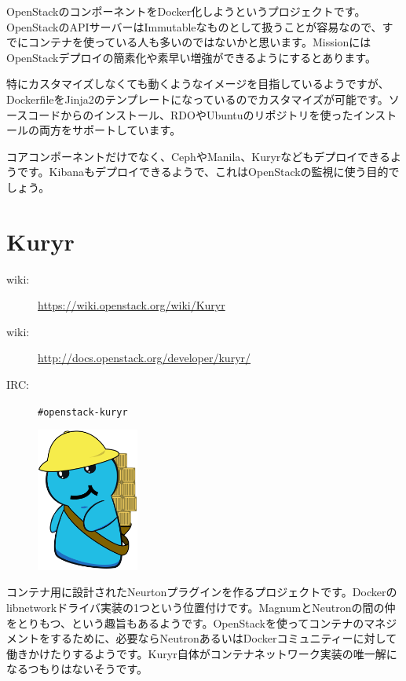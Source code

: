 OpenStackのコンポーネントをDocker化しようというプロジェクトです。OpenStackのAPIサーバーはImmutableなものとして扱うことが容易なので、すでにコンテナを使っている人も多いのではないかと思います。MissionにはOpenStackデプロイの簡素化や素早い増強ができるようにするとあります。

特にカスタマイズしなくても動くようなイメージを目指しているようですが、DockerfileをJinja2のテンプレートになっているのでカスタマイズが可能です。ソースコードからのインストール、RDOやUbuntuのリポジトリを使ったインストールの両方をサポートしています。

コアコンポーネントだけでなく、CephやManila、Kuryrなどもデプロイできるようです。Kibanaもデプロイできるようで、これはOpenStackの監視に使う目的でしょう。

\section{Kuryr}

\begin{description}
	\item[wiki:] \url{https://wiki.openstack.org/wiki/Kuryr}
	\item[wiki:] \url{http://docs.openstack.org/developer/kuryr/}
	\item[IRC:] \verb|#openstack-kuryr|
\end{description}

\begin{figure}
	\begin{center}
		\includegraphics[width=0.3\textwidth]{img/kuryr_logo.png}
	\end{center}
\end{figure}

コンテナ用に設計されたNeurtonプラグインを作るプロジェクトです。Dockerのlibnetworkドライバ実装の1つという位置付けです。MagnumとNeutronの間の仲をとりもつ、という趣旨もあるようです。OpenStackを使ってコンテナのマネジメントをするために、必要ならNeutronあるいはDockerコミュニティーに対して働きかけたりするようです。Kuryr自体がコンテナネットワーク実装の唯一解になるつもりはないそうです。

